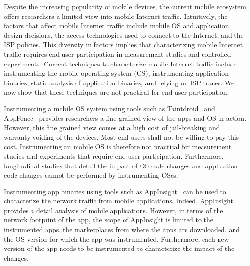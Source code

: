 
Despite the increasing popularity of mobile devices, the current mobile ecosystem offers researchers a limited view into mobile Internet traffic.
Intuitively, the factors that affect mobile Internet traffic include mobile OS and application design decisions, the access technologies used to connect to the Internet, and the ISP policies. 
This diversity in factors implies that characterizing mobile Internet traffic requires end user participation in measurement studies and controlled experiments.
Current techniques to characterize mobile Internet traffic include instrumenting the mobile operating system (OS), instrumenting application binaries, static analysis of application binaries, and relying on ISP traces. 
We now show that these techniques are not practical for end user participation.

Instrumenting a mobile OS system using tools such as Taintdroid~\cite{enck:taintdroid} and AppFence~\cite{hornyack:appfence} provides researchers a fine grained view of the apps and OS in action. 
However, this fine grained view comes at a high cost of jail-breaking and warranty voiding of the devices.
Most end users shall not be willing to pay this cost. 
Instrumenting an mobile OS is therefore not practical for measurement studies and experiments that require end user participation. 
Furthermore, longitudinal studies that detail the impact of OS code changes and application code changes cannot be performed by instrumenting OSes.

Instrumenting app binaries using tools such as AppInsight~\cite{ravindranath:appinsight} can be used to characterize the network traffic from mobile applications. 
Indeed, AppInsight provides a detail analysis of mobile applications.
However, in terms of the network footprint of the app, the scope of AppInsight is limited to the instrumented apps, the marketplaces from where the apps are downloaded, and the OS version for which the app was instrumented.
Furthermore, each new version of the app needs to be instrumented to characterize the impact of the changes.

